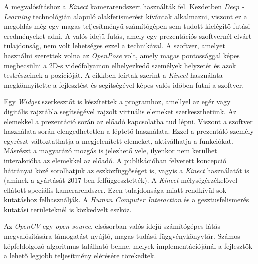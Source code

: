 A megvalósításhoz a \textit{Kinect} kamerarendszert használták fel. Kezdetben \textit{Deep\- -Learning} technológián alapuló alakferismerést kívántak alkalmazni, viszont ez a megoldás még egy magas teljesítményű számítógépen sem tudott kielégítő futási eredményeket adni. A valós idejű futás, amely egy prezentációs szoftvernél elvárt tulajdonság, nem volt lehetséges ezzel a technikával. A szoftver, amelyet használni szerettek volna az \textit{OpenPose} volt, amely magas pontossággal képes megbecsülni a 2D-s videófolyamon elhelyezkedő személyek helyzetét és azok testrészeinek a pozícióját. \cite{cao2018openpose}
A cikkben leírtak szerint a \textit{Kinect} használata megkönnyítette a fejlesztést és segítségével képes valós időben futni a szoftver.

Egy \textit{Widget} szerkesztőt is készítettek a programhoz, amellyel az egér vagy digitális rajztábla segítségével rajzolt virtuális elemeket szerkeszthetünk. Az elemekkel a prezentáció során az előadó kapcsolatba tud lépni. Viszont a szoftver használata során elengedhetetlen a léptető használata. Ezzel a prezentáló személy egyrészt változtathatja a megjelenített elemeket, aktiválhatja a funkciókat. Másrészt a magyarázó mozgás is jelezhető vele, ilyenkor nem kerülhet interakcióba az elemekkel az előadó.
A publikációban felvetett koncepció hátrányai közé sorolhatjuk az eszközfüggőséget is, vagyis a \textit{Kinect} használatát is (aminek a gyártását 2017-ben felfüggesztették). A \textit{Kinect} mélységérzékelővel ellátott speciális kamerarendszer. Ezen tulajdonsága miatt rendkívül sok kutatáshoz felhasználják. A \textit{Human Computer Interaction} és a gesztusfelismerés kutatási területeknél is közkedvelt eszköz. \cite{zhang2013new} \cite{tang2018structured}



Az \textit{OpenCV} egy \textit{open source}, elsősorban valós idejű számítógépes látás megvalósítására támogatást nyújtó, magas tudású függvénykönyvtár. Számos képfeldolgozó algoritmus található benne, melyek implementációjánál a fejlesztők a lehető legjobb teljesítmény elérésére törekedtek.

